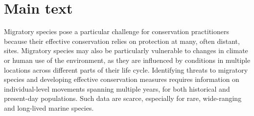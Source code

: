 \documentclass[a4paper,12pt]{article}
\begin{document}
\section{Main text}
Migratory species pose a particular challenge for conservation practitioners because their effective conservation relies on protection at many, often distant, sites\cite{runge2014conserving}. 
Migratory species may also be particularly vulnerable to changes in climate or human use of the environment, as they are influenced by conditions in multiple locations across different parts of their life cycle\cite{robinson2009travelling}. 
Identifying threats to migratory species and developing effective conservation measures requires information on individual-level movements spanning multiple years, for both historical and present-day populations. 
Such data are scarce, especially for rare, wide-ranging and long-lived marine species\cite{ryan2013stable,hall2005stable,bailey2009behavioural}. 
 
\end{document}
